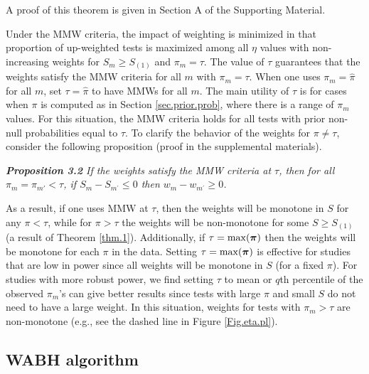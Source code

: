 \documentclass[bimj,fleqn]{w-art}
\newcommand{\mbf}[1]{\mbox{\boldmath${#1}$}}
\theoremstyle{plain}
\theoremstyle{definition}
\begin{document}
\noindent A proof of this theorem is given in Section A of the Supporting Material. 

Under the MMW criteria, the impact of weighting is minimized in that proportion of up-weighted tests is maximized among all $\eta$ values with non-increasing weights for $S_m \geq S_{(1)}$ and $\pi_m = \tau$. The value of $\tau$ guarantees that the weights satisfy the MMW criteria for all $m$ with $\pi_m=\tau$. When one uses $\pi_m=\hat\pi$ for all $m$, set $\tau=\hat \pi$ to have MMWs for all $m$. The main utility of $\tau$ is for cases when $\pi$ is computed as in Section \ref{sec.prior.prob}, where there is a range of $\pi_m$ values. For this situation, the MMW criteria holds for all tests with prior non-null probabilities equal to $\tau$. To clarify the behavior of the weights for $\pi \neq \tau$, consider the following proposition (proof in the supplemental materials).

\textit{\textbf{Proposition 3.2} If the weights satisfy the MMW criteria at $\tau$, then for all $\pi_m=\pi_{m'} < \tau$, if $S_{m} - S_{m^\prime}\leq 0$ then $w_{m} - w_{m^\prime}\geq 0$. }

As a result, if one uses MMW at $\tau$, then the weights will be monotone in $S$ for any $\pi<\tau$, while for $\pi>\tau$ the weights will be non-monotone for some $S\geq S_{(1)}$ (a result of Theorem \ref{thm.1}). Additionally, if $\tau = \max(\mbf{\pi})$ then the weights will be monotone for each $\pi$ in the data. Setting $\tau = \max(\mbf{\pi})$ is effective for studies that are low in power since all weights will be monotone in $S$ (for a fixed $\pi$). For studies with more robust power, we find setting $\tau$ to mean or $q$th percentile of the observed $\pi_m$'s can give better results since tests with large $\pi$ and small $S$ do not need to have a large weight. In this situation, weights for tests with $\pi_m>\tau$ are non-monotone (e.g., see the dashed line in Figure \ref{Fig.eta.pl}). 


\subsection{WABH algorithm}\label{sec.eff.size}
\end{document}
